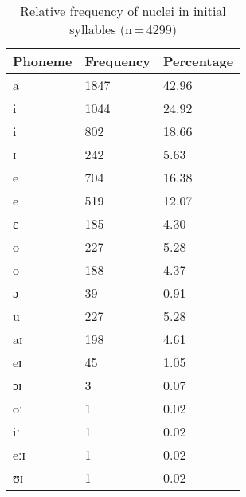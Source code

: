 \begin{table}[hp]\centering
\caption[Relative frequency of nuclei in initial syllables]{Relative frequency of nuclei in initial syllables (n\,=\,4299)}
\begin{tabu} to 0.5\textwidth{X X[c] X[c]}
\tableheaderfont\toprule
Phoneme
	& Frequency
	& Percentage
	\\
	
\toprule

a
	& 1847
	& 42.96\pct
	\\

i
	& 1044
	& 24.92\pct
	\\

\rowfont{\footnotesize\itshape}
\raggedleft i
	& 802
	& 18.66\pct
	\\

\rowfont{\footnotesize\itshape}
\raggedleft ɪ
	& 242
	& 5.63\pct
	\\

e
	& 704
	& 16.38\pct
	\\

\rowfont{\footnotesize\itshape}
\raggedleft e
	& 519
	& 12.07\pct
	\\

\rowfont{\footnotesize\itshape}
\raggedleft ɛ
	& 185
	& 4.30\pct
	\\

o
	& 227
	& 5.28\pct
	\\

\rowfont{\footnotesize\itshape}
\raggedleft o
	& 188
	& 4.37\pct
	\\

\rowfont{\footnotesize\itshape}
\raggedleft ɔ
	& 39
	& 0.91\pct
	\\

u
	& 227
	& 5.28\pct
	\\

aɪ
	& 198
	& 4.61\pct
	\\

eɪ
	& 45
	& 1.05\pct
	\\

ɔɪ
	& 3
	& 0.07\pct
	\\

oː
	& 1
	& 0.02\pct
	\\

iː
	& 1
	& 0.02\pct
	\\

eːɪ
	& 1
	& 0.02\pct
	\\

ʊɪ
	& 1
	& 0.02\pct
	\\
	
\bottomrule
\end{tabu}
\label{tab:initnuc}
\end{table}

